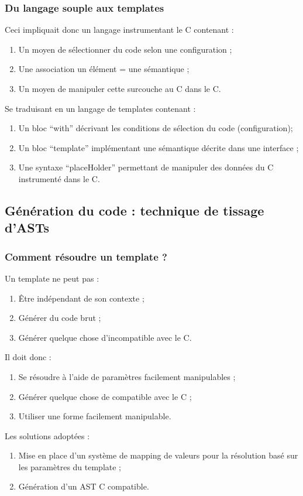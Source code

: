 \documentclass[]{beamer}
\begin{document}
\begin{frame}
\frametitle{Du langage souple aux templates}
 {
    Ceci impliquait donc un langage instrumentant le C contenant :
    \begin{enumerate}[<+->]
        \item Un moyen de sélectionner du code selon une configuration ;
        \item Une association un élément = une sémantique ;
        \item Un moyen de manipuler cette surcouche au C dans le C.
    \end{enumerate}
}
 {
    Se traduisant en un langage de templates contenant :
    \begin{enumerate}
        \item Un bloc ``with'' décrivant les conditions de sélection
            du code (configuration);
        \item Un bloc ``template'' implémentant une sémantique décrite dans
            une interface ;
        \item Une syntaxe ``placeHolder'' permettant de manipuler
            des données du C instrumenté dans le C.
    \end{enumerate}
}
\end{frame}

\subsection{Génération du code : technique de tissage d'ASTs}
\begin{frame}
\frametitle{Comment résoudre un template ?}
 {
    Un template ne peut pas :
    \begin{enumerate}[<+->]
        \item Être indépendant de son contexte ;
        \item Générer du code brut ;
        \item Générer quelque chose d'incompatible avec le C.
    \end{enumerate}
     {
        Il doit donc :
        \begin{enumerate}[<+->]
            \item Se résoudre à l'aide de paramètres facilement manipulables ;
            \item Générer quelque chose de compatible avec le C ;
            \item Utiliser une forme facilement manipulable.
        \end{enumerate}
    }
}
 {
    Les solutions adoptées :
    \begin{enumerate}
        \item Mise en place d'un système de mapping de valeurs pour
            la résolution basé sur les paramètres du template ;
        \item Génération d'un AST C compatible.
    \end{enumerate}
}
\end{frame}
\end{document}
